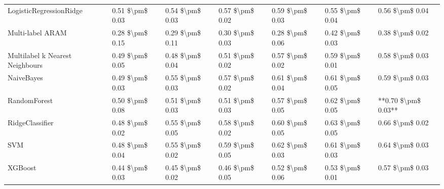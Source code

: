 \begin{tabular}{lllllll}
        LogisticRegressionRidge & 0.51 \$\textbackslash pm\$ 0.03 &           0.54 \$\textbackslash pm\$ 0.03 &       0.57 \$\textbackslash pm\$ 0.02 &        0.59 \$\textbackslash pm\$ 0.03 &                         0.55 \$\textbackslash pm\$ 0.04 &     0.56 \$\textbackslash pm\$ 0.04 \\
               Multi-label ARAM & 0.28 \$\textbackslash pm\$ 0.15 &           0.29 \$\textbackslash pm\$ 0.11 &       0.30 \$\textbackslash pm\$ 0.03 &        0.28 \$\textbackslash pm\$ 0.06 &                         0.42 \$\textbackslash pm\$ 0.03 &     0.38 \$\textbackslash pm\$ 0.02 \\
Multilabel k Nearest Neighbours & 0.49 \$\textbackslash pm\$ 0.05 &           0.48 \$\textbackslash pm\$ 0.04 &       0.51 \$\textbackslash pm\$ 0.02 &        0.57 \$\textbackslash pm\$ 0.02 &                         0.59 \$\textbackslash pm\$ 0.01 &     0.58 \$\textbackslash pm\$ 0.03 \\
                     NaiveBayes & 0.49 \$\textbackslash pm\$ 0.03 &           0.55 \$\textbackslash pm\$ 0.03 &       0.57 \$\textbackslash pm\$ 0.02 &        0.61 \$\textbackslash pm\$ 0.04 &                         0.61 \$\textbackslash pm\$ 0.05 &     0.59 \$\textbackslash pm\$ 0.03 \\
                   RandomForest & 0.50 \$\textbackslash pm\$ 0.08 &           0.51 \$\textbackslash pm\$ 0.03 &       0.51 \$\textbackslash pm\$ 0.03 &        0.57 \$\textbackslash pm\$ 0.05 &                         0.62 \$\textbackslash pm\$ 0.05 & **0.70 \$\textbackslash pm\$ 0.03** \\
                RidgeClassifier & 0.48 \$\textbackslash pm\$ 0.02 &           0.55 \$\textbackslash pm\$ 0.05 &       0.58 \$\textbackslash pm\$ 0.02 &        0.60 \$\textbackslash pm\$ 0.05 &                         0.63 \$\textbackslash pm\$ 0.05 &     0.66 \$\textbackslash pm\$ 0.02 \\
                            SVM & 0.48 \$\textbackslash pm\$ 0.04 &           0.55 \$\textbackslash pm\$ 0.02 &       0.59 \$\textbackslash pm\$ 0.05 &        0.62 \$\textbackslash pm\$ 0.03 &                         0.61 \$\textbackslash pm\$ 0.03 &     0.64 \$\textbackslash pm\$ 0.03 \\
                        XGBoost & 0.44 \$\textbackslash pm\$ 0.03 &           0.45 \$\textbackslash pm\$ 0.02 &       0.46 \$\textbackslash pm\$ 0.05 &        0.52 \$\textbackslash pm\$ 0.06 &                         0.53 \$\textbackslash pm\$ 0.01 &     0.57 \$\textbackslash pm\$ 0.03 \\
\bottomrule
\end{tabular}
